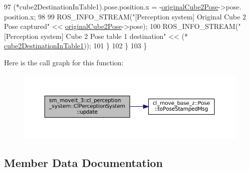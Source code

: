 \begin{DoxyCode}
97                 (*cube2DestinationInTable1).pose.position.x = -\hyperlink{classsm__moveit__3_1_1cl__perception__system_1_1ClPerceptionSystem_a71df0282435faa5f108c4fb2d846e90f}{originalCube2Pose}->pose.
      position.x;
98 
99                 ROS\_INFO\_STREAM(\textcolor{stringliteral}{"[Perception system] Original Cube 2 Pose captured"} << 
      \hyperlink{classsm__moveit__3_1_1cl__perception__system_1_1ClPerceptionSystem_a71df0282435faa5f108c4fb2d846e90f}{originalCube2Pose}->pose);
100                 ROS\_INFO\_STREAM(\textcolor{stringliteral}{"[Perception system] Cube 2 Pose table 1 destination"} << (*
      \hyperlink{classsm__moveit__3_1_1cl__perception__system_1_1ClPerceptionSystem_a1aae7fcf13de6c6b6c07dd2b595a5538}{cube2DestinationInTable1}));
101             \}
102         \}
103     \}
\end{DoxyCode}
Here is the call graph for this function\+:
\nopagebreak
\begin{figure}[H]
\begin{center}
\leavevmode
\includegraphics[width=350pt]{classsm__moveit__3_1_1cl__perception__system_1_1ClPerceptionSystem_a53ce2f7a00275f8c1ce4a0e640bbe3d8_cgraph}
\end{center}
\end{figure}


\subsection{Member Data Documentation}
\mbox{\label{classsm__moveit__3_1_1cl__perception__system_1_1ClPerceptionSystem_a56f5be6a474c2825b99cab724d2099a1}} 
